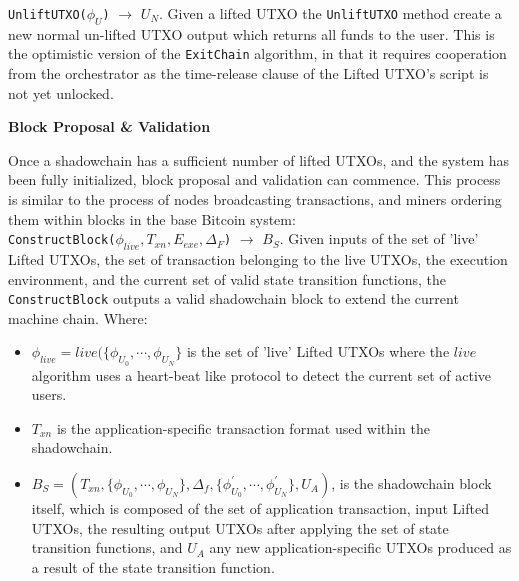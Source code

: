 \documentclass[10pt,a4paper]{article}
\theoremstyle{definition}
\begin{document}
\texttt{UnliftUTXO($\phi_{U}$)} $\rightarrow$ $U_{N}$. Given a lifted UTXO the
\texttt{UnliftUTXO} method create a new normal un-lifted UTXO output
which returns all funds to the user. This is the optimistic version of the
\texttt{ExitChain} algorithm, in that it requires cooperation from the
orchestrator as the time-release clause of the Lifted UTXO's script is not yet
unlocked.


\begin{center}
    \textbf{Block Proposal \& Validation}
\end{center}

Once a shadowchain has a sufficient number of lifted UTXOs, and the system has
been fully initialized, block proposal and validation can commence. This
process is similar to the process of nodes broadcasting transactions, and
miners ordering them within blocks in the base Bitcoin system: \\

\texttt{ConstructBlock($\phi_{live}, T_{xn}, E_{exe}, \Delta_F$)} $\rightarrow$
$B_S$. Given inputs of the set of 'live' Lifted UTXOs, the set of transaction
belonging to the live UTXOs, the execution environment, and the current set of
valid state transition
functions, the \texttt{ConstructBlock} outputs a valid shadowchain block to
extend the current machine chain. Where: 
\begin{itemize}
    \item $\phi_{live} = live(\{\phi_{U_0}, \cdots, \phi_{U_N}\}$ is the set of
            'live' Lifted UTXOs where the $live$ algorithm uses a heart-beat
            like protocol to detect the current set of active users.

    \item $T_{xn}$ is the application-specific transaction format used within
        the shadowchain.

    \item $B_S = (T_{xn}, \{\phi_{U_0}, \cdots, \phi_{U_N}\}, \Delta_{f},
        \{\phi_{U_0}^\prime, \cdots, \phi_{U_N}^\prime\}, U_{A})$, is the
        shadowchain block itself, which is composed of the set of application
        transaction, input Lifted UTXOs, the resulting output UTXOs after
        applying the set of state transition functions, and $U_{A}$ any new
        application-specific UTXOs produced as a result of the state transition
        function.
\end{itemize}
\end{document}

